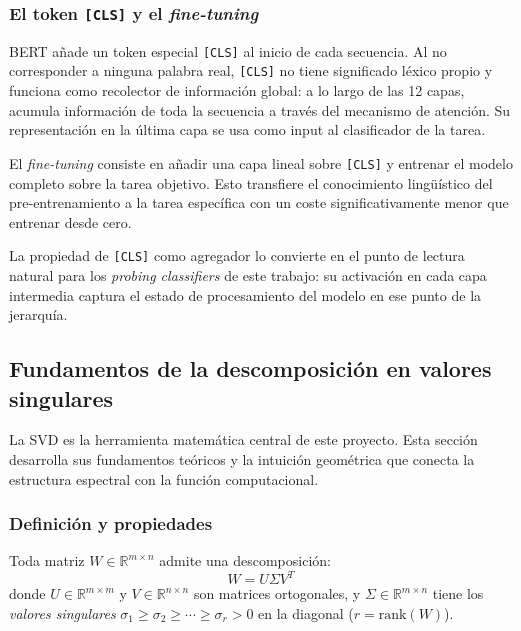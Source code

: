 \subsubsection{El token \texttt{[CLS]} y el \emph{fine-tuning}}
\label{sec:sota-cls}

BERT añade un token especial \texttt{[CLS]} al inicio de cada secuencia. Al no
corresponder a ninguna palabra real, \texttt{[CLS]} no tiene significado léxico
propio y funciona como recolector de información global: a lo largo de las 12 capas,
acumula información de toda la secuencia a través del mecanismo de atención. Su
representación en la última capa se usa como input al clasificador de la tarea.

El \emph{fine-tuning} consiste en añadir una capa lineal sobre \texttt{[CLS]} y entrenar
el modelo completo sobre la tarea objetivo. Esto transfiere el conocimiento
lingüístico del pre-entrenamiento a la tarea específica con un coste
significativamente menor que entrenar desde cero.

La propiedad de \texttt{[CLS]} como agregador lo convierte en el punto de lectura
natural para los \textit{probing classifiers} de este trabajo: su activación en
cada capa intermedia captura el estado de procesamiento del modelo en ese punto de
la jerarquía.

\subsection{Fundamentos de la descomposición en valores singulares}
\label{sec:sota-svd-teoria}

La SVD es la herramienta matemática central de este proyecto. Esta sección
desarrolla sus fundamentos teóricos y la intuición geométrica que conecta la
estructura espectral con la función computacional.

\subsubsection{Definición y propiedades}
\label{sec:sota-svd-definicion}

Toda matriz $W \in \mathbb{R}^{m \times n}$ admite una descomposición:
\begin{equation}
    W = U \Sigma V^T
    \label{eq:svd-completa}
\end{equation}
donde $U \in \mathbb{R}^{m \times m}$ y $V \in \mathbb{R}^{n \times n}$ son
matrices ortogonales, y $\Sigma \in \mathbb{R}^{m \times n}$ tiene los
\emph{valores singulares} $\sigma_1 \geq \sigma_2 \geq \cdots \geq \sigma_r > 0$
en la diagonal ($r = \text{rank}(W)$).

